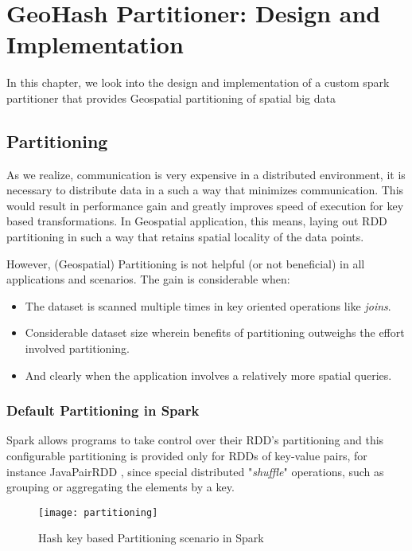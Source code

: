 \documentclass[article,type=msc,colorback,10pt,accentcolor=tud1d]{tudthesis}
\begin{document}
		  
     \cleardoublepage
     \hfill
	\section{GeoHash Partitioner: Design and Implementation}
		\hfill 
	
	In this chapter, we look into the design and implementation of a custom spark partitioner that provides  Geospatial partitioning of spatial big data
		\subsection{Partitioning}
			\par As we realize, communication is very expensive in a distributed environment, it is necessary to distribute data in a such a way that minimizes communication. This would result in performance gain and greatly improves speed of execution for key based transformations. In Geospatial application, this means, laying out RDD partitioning in such a way that retains spatial locality of the data points. 
			
			However, (Geospatial) Partitioning is not helpful (or not beneficial) in all applications and scenarios. The gain is considerable when: \cite{sparkbook}
			\begin{itemize}
				\item The dataset is scanned multiple times in key oriented operations like \textit{joins}.
				\item Considerable dataset size wherein benefits of partitioning outweighs the effort involved partitioning.
				\item And clearly when the application involves a relatively more spatial queries.
			\end{itemize}
			
		\subsubsection{Default Partitioning in Spark}
			\par Spark allows programs to take control over their RDD's partitioning and this configurable partitioning is provided only for RDDs of key-value pairs, for instance JavaPairRDD \cite{sparkapiPairRDD}, since special distributed "\textit{shuffle}" operations, such as grouping or aggregating the elements by a key.\\
			
				\begin{figure}[h]
					\centering
					\texttt{[image: partitioning]}
					\caption{Hash key based Partitioning scenario in Spark}
					\label{fig:partitioning}
				\end{figure}
				
\end{document}
